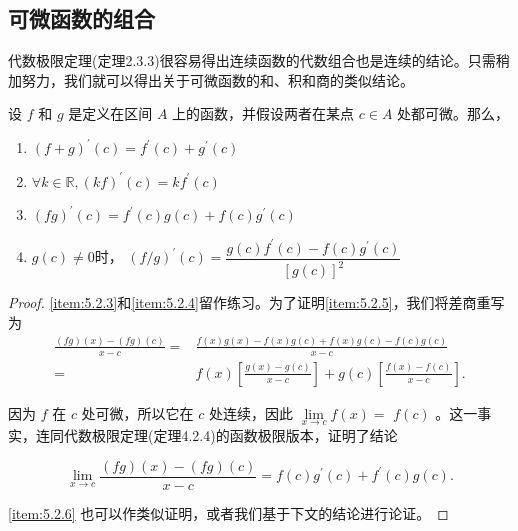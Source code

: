 \subsection{可微函数的组合}

代数极限定理(定理2.3.3)很容易得出连续函数的代数组合也是连续的结论。只需稍加努力，我们就可以得出关于可微函数的和、积和商的类似结论。

\begin{Thm}\label{thm:5.2.4}
  设 \(f\) 和 \(g\) 是定义在区间 \(A\) 上的函数，并假设两者在某点 \(c \in  A\) 处都可微。那么，
\begin{enumerate}[label=(\roman*)]
\item\label{item:5.2.3}\({\left( f + g\right) }^{\prime }\left( c\right)  = {f}^{\prime }\left( c\right)  + {g}^{\prime }\left( c\right)\) 
\item \label{item:5.2.4} \(\forall k\in \mathbb{R}, {\left( kf\right) }^{\prime }\left( c\right)  = k{f}^{\prime }\left( c\right)\) 
\item \label{item:5.2.5}\({\left( fg\right) }^{\prime }\left( c\right)  = {f}^{\prime }\left( c\right) g\left( c\right)  + f\left( c\right) {g}^{\prime }\left( c\right)\) 
\item \label{item:5.2.6} $g(c)\ne 0$时， \({\left( f/g\right) }^{\prime }\left( c\right)  = \dfrac{g\left( c\right) {f}^{\prime }\left( c\right)  - f\left( c\right) {g}^{\prime }\left( c\right) }{{\left\lbrack  g\left( c\right) \right\rbrack  }^{2}}\) 
\end{enumerate}
\end{Thm}

\begin{proof}
\ref{item:5.2.3}和\ref{item:5.2.4}留作练习。为了证明\ref{item:5.2.5}，我们将差商重写为
\begin{align*}
\frac{\left( {fg}\right) \left( x\right)  - \left( {fg}\right) \left( c\right) }{x - c} =& \frac{f\left( x\right) g\left( x\right)  - f\left( x\right) g\left( c\right)  + f\left( x\right) g\left( c\right)  - f\left( c\right) g\left( c\right) }{x - c}\\
= & f\left( x\right) \left\lbrack  \frac{g\left( x\right)  - g\left( c\right) }{x - c}\right\rbrack   + g\left( c\right) \left\lbrack  \frac{f\left( x\right)  - f\left( c\right) }{x - c}\right\rbrack  .
\end{align*}


因为 \(f\) 在 \(c\) 处可微，所以它在 \(c\) 处连续，因此 \(\mathop{\lim }\limits_{{x \rightarrow  c}}f\left( x\right)  =\)  \(f\left( c\right)\) 。这一事实，连同代数极限定理(定理4.2.4)的函数极限版本，证明了结论

\[
\mathop{\lim }\limits_{{x \rightarrow  c}}\frac{\left( {fg}\right) \left( x\right)  - \left( {fg}\right) \left( c\right) }{x - c} = f\left( c\right) {g}^{\prime }\left( c\right)  + {f}^{\prime }\left( c\right) g\left( c\right) .
\]

\ref{item:5.2.6} 也可以作类似证明，或者我们基于下文的结论进行论证。
  
\end{proof}

